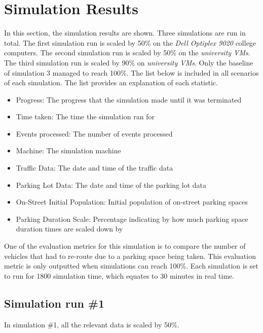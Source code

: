 \pagebreak

\section{Simulation Results}
In this section, the simulation results are shown. Three simulations are run in total. The first simulation run is scaled by 50\% on the \textit{Dell Optiplex 9020} college computers. The second simulation run is scaled by 50\% on the \textit{university VMs}. The third simulation run is scaled by 90\% on \textit{university VMs}. Only the baseline of simulation 3 managed to reach 100\%. The list below is included in all scenarios of each simulation. The list provides an explanation of each statistic.

\begin{itemize}
    \setlength\itemsep{0em}
    \item Progress: The progress that the simulation made until it was terminated
    \item Time taken: The time the simulation ran for
    \item Events processed: The number of events processed
    \item Machine: The simulation machine
    \item Traffic Data: The date and time of the traffic data
    \item Parking Lot Data: The date and time of the parking lot data
    \item On-Street Initial Population: Initial population of on-street parking spaces
    \item Parking Duration Scale: Percentage indicating by how much parking space duration times are scaled down by
\end{itemize}

One of the evaluation metrics for this simulation is to compare the number of vehicles that had to re-route due to a parking space being taken. This evaluation metric is only outputted when simulations can reach 100\%.
Each simulation is set to run for 1800 simulation time, which equates to 30 minutes in real time.

\pagebreak

\subsection{Simulation run \#1}
In simulation \#1, all the relevant data is scaled by 50\%.
